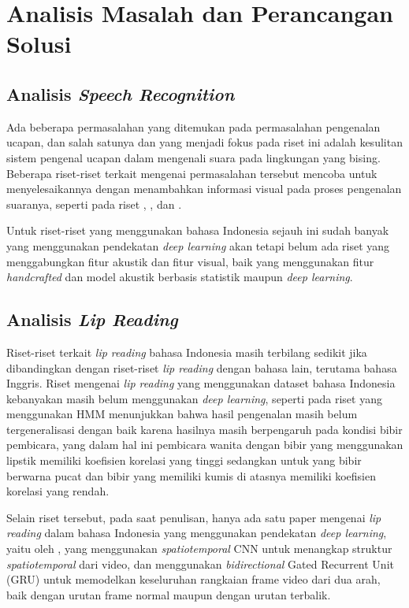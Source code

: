 \chapter{Analisis Masalah dan Perancangan Solusi}

\section{Analisis \textit{Speech Recognition}}

Ada beberapa permasalahan yang ditemukan pada permasalahan pengenalan ucapan, dan salah satunya dan yang menjadi fokus pada riset ini adalah kesulitan sistem pengenal ucapan dalam mengenali suara pada lingkungan yang bising. Beberapa riset-riset terkait mengenai permasalahan tersebut mencoba untuk menyelesaikannya dengan menambahkan informasi visual pada proses pengenalan suaranya, seperti pada riset \textcite{Chung2017}, \textcite{Chung2016}, dan \textcite{Assael2016}.
\bigskip

Untuk riset-riset yang menggunakan bahasa Indonesia sejauh ini sudah banyak yang menggunakan pendekatan \textit{deep learning} akan tetapi belum ada riset yang menggabungkan fitur akustik dan fitur visual, baik yang menggunakan fitur \textit{handcrafted} dan model akustik berbasis statistik maupun \textit{deep learning}.


\section{Analisis \textit{Lip Reading}}

Riset-riset terkait \textit{lip reading} bahasa Indonesia masih terbilang sedikit jika dibandingkan dengan riset-riset \textit{lip reading} dengan bahasa lain, terutama bahasa Inggris. Riset mengenai \textit{lip reading} yang menggunakan dataset bahasa Indonesia kebanyakan masih belum menggunakan \textit{deep learning}, seperti pada riset \textcite{Achmad2015} yang menggunakan HMM menunjukkan bahwa hasil pengenalan masih belum tergeneralisasi dengan baik karena hasilnya masih berpengaruh pada kondisi bibir pembicara, yang dalam hal ini pembicara wanita dengan bibir yang menggunakan lipstik memiliki koefisien korelasi yang tinggi sedangkan untuk yang bibir berwarna pucat dan bibir yang memiliki kumis di atasnya memiliki koefisien korelasi yang rendah.
\bigskip

Selain riset tersebut, pada saat penulisan, hanya ada satu paper mengenai \textit{lip reading} dalam bahasa Indonesia yang menggunakan pendekatan \textit{deep learning}, yaitu oleh \textcite{Maulana2018}, yang menggunakan \textit{spatiotemporal} CNN untuk menangkap struktur \textit{spatiotemporal} dari video, dan menggunakan \textit{bidirectional} Gated Recurrent Unit (GRU) untuk memodelkan keseluruhan rangkaian frame video dari dua arah, baik dengan urutan frame normal maupun dengan urutan terbalik.


